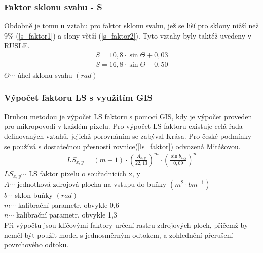 \subsubsection{Faktor sklonu svahu - S} 
Obdobně je tomu u vztahu pro faktor sklonu svahu, jež se liší pro
sklony nižší než 9\% (\ref{s_faktor1}) a slony větší
(\ref{s_faktor2}). Tyto vztahy byly taktéž uvedeny v
RUSLE\cite{rusle1997}.
\begin{align}
   \label{s_faktor1} S=10,8\cdot\sin\Theta + 0,03
\end{align}
\vspace{-40pt}
\begin{align}
   \label{s_faktor2} S=16,8\cdot\sin\Theta - 0,50
\end{align}
\hspace*{2cm}$\Theta \cdots$ úhel sklonu svahu $\left( rad \right)$

\subsubsection{Výpočet faktoru LS s využitím GIS} 
Druhou metodou je výpočet LS faktoru s pomocí GIS, kdy je výpočet
proveden pro mikropovodí v každém pixelu. Pro výpočet LS faktoru
existuje celá řada definovaných vztahů, jejichž porovnáním se zabýval
Krása\cite{Krasa2010}. Pro české podmínky se používá s dostatečnou
přesností rovnice(\ref{ls_faktor}) odvozená
Mitášovou\cite{Mitasova1998}.\cite{Dostal2014}
\begin{align}
   \label{ls_faktor} LS_{x,y}=\left( m+1 \right)\cdot\left(\frac{A_{x,y}}{22,13}\right)^m \cdot \left(\frac{\sin b_{x,y}}{0,09}\right)^n
\end{align}
\hspace*{2cm}$LS_{x,y} \cdots$ LS faktor pixelu o souřadnicích x, y
\\ \hspace*{2cm}$A \cdots$ jednotková zdrojová plocha na vstupu do
buňky $\left( m^2\cdot bm^{-1} \right)$ \\
\hspace*{2cm}$b \cdots$ sklon buňky $\left( rad \right)$ \\
\hspace*{2cm}$m \cdots$ kalibrační parametr, obvykle 0,6\\
\hspace*{2cm}$n \cdots$ kalibrační parametr, obvykle 1,3\\

Při výpočtu jsou klíčovými faktory určení rastru zdrojových ploch,
přičemž by neměl být použit model s jednosměrným odtokem, a zohlednění
přerušení povrchového odtoku.\cite{Krasa2010}
\newpage
